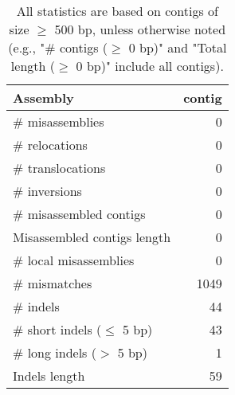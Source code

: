 \documentclass[12pt,a4paper]{article}
\begin{document}
\begin{table}[ht]
\begin{center}
\caption{All statistics are based on contigs of size $\geq$ 500 bp, unless otherwise noted (e.g., "\# contigs ($\geq$ 0 bp)" and "Total length ($\geq$ 0 bp)" include all contigs).}
\begin{tabular}{|l*{1}{|r}|}
\hline
Assembly & contig \\ \hline
\# misassemblies & 0 \\ \hline
\hspace{5mm}\# relocations & 0 \\ \hline
\hspace{5mm}\# translocations & 0 \\ \hline
\hspace{5mm}\# inversions & 0 \\ \hline
\# misassembled contigs & 0 \\ \hline
Misassembled contigs length & 0 \\ \hline
\# local misassemblies & 0 \\ \hline
\# mismatches & 1049 \\ \hline
\# indels & 44 \\ \hline
\hspace{5mm}\# short indels ($\leq$ 5 bp) & 43 \\ \hline
\hspace{5mm}\# long indels ($>$ 5 bp) & 1 \\ \hline
Indels length & 59 \\ \hline
\end{tabular}
\end{center}
\end{table}
\end{document}
